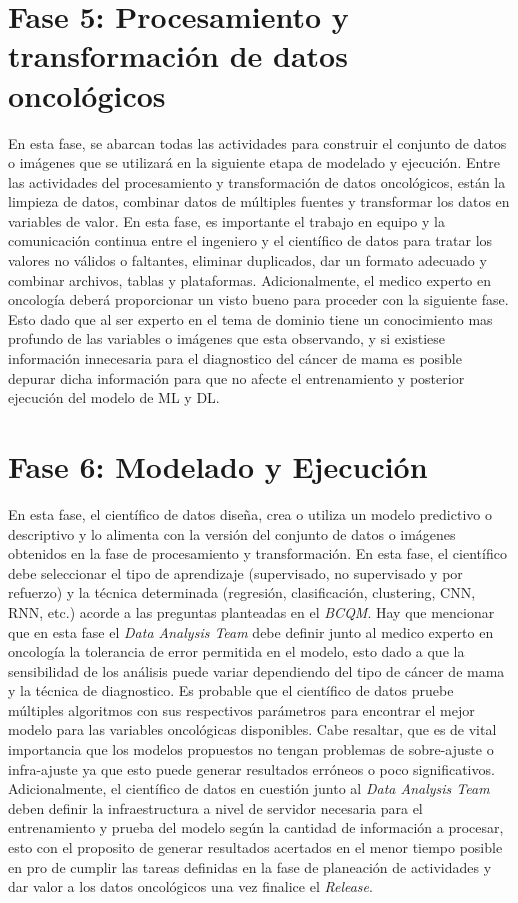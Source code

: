 \section{Fase 5: Procesamiento y transformación de datos oncológicos}
En esta fase, se abarcan todas las actividades para construir el conjunto de datos o imágenes que se utilizará en la siguiente etapa de modelado y ejecución. Entre las actividades del procesamiento y transformación de datos oncológicos, están la limpieza de datos, combinar datos de múltiples fuentes y transformar los datos en variables de valor. En esta fase, es importante el trabajo en equipo y la comunicación continua entre el ingeniero y el científico de datos para tratar los valores no válidos o faltantes, eliminar duplicados, dar un formato adecuado y combinar archivos, tablas y plataformas. Adicionalmente, el medico experto en oncología deberá proporcionar un visto bueno para proceder con la siguiente fase. Esto dado que al ser experto en el tema de dominio tiene un conocimiento mas profundo de las variables o imágenes que esta observando, y si existiese información innecesaria para el diagnostico del cáncer de mama es posible depurar dicha información para que no afecte el entrenamiento y posterior ejecución del modelo de ML y DL.

\section{Fase 6: Modelado y Ejecución}
En esta fase, el científico de datos diseña, crea o utiliza un modelo predictivo o descriptivo y lo alimenta con la versión del conjunto de datos o imágenes obtenidos en la fase de procesamiento y transformación. En esta fase, el científico debe seleccionar el tipo de aprendizaje (supervisado, no supervisado y por refuerzo) y la técnica determinada (regresión, clasificación, clustering, CNN, RNN, etc.) acorde a las preguntas planteadas en el \textit{BCQM}. Hay que mencionar que en esta fase el \textit{Data Analysis Team} debe definir junto al medico experto en oncología la tolerancia de error permitida en el modelo, esto dado a que la sensibilidad de los análisis puede variar dependiendo del tipo de cáncer de mama y la técnica de diagnostico. Es probable que el científico de datos pruebe múltiples algoritmos con sus respectivos parámetros para encontrar el mejor modelo para las variables oncológicas disponibles. Cabe resaltar, que es de vital importancia que los modelos propuestos no tengan problemas de sobre-ajuste o infra-ajuste ya que esto puede generar resultados erróneos o poco significativos. Adicionalmente, el científico de datos en cuestión junto al \textit{Data Analysis Team} deben definir la infraestructura a nivel de servidor necesaria para el entrenamiento y prueba del modelo según la cantidad de información a procesar, esto con el proposito de generar resultados acertados en el menor tiempo posible en pro de cumplir las tareas definidas en la fase de planeación de actividades y dar valor a los datos oncológicos una vez finalice el \textit{Release}.

